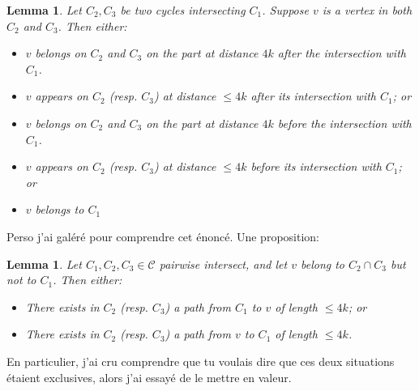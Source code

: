 \documentclass[utf8,10pt]{article}
\theoremstyle{plain}
\newtheorem{lemma}[theorem]{Lemma}
\theoremstyle{definition}
\theoremstyle{remark}
\newcommand{\nathann}[1]{{\color{blue}{\bf Nathann:} #1}}
\begin{document}
\begin{lemma}\label{dis}
Let $C_2, C_3$ be two cycles intersecting $C_1$. Suppose $v$ is a vertex in both $C_2$ and $C_3$. Then \nathann{either}:
\begin{itemize}
	\item $v$ belongs on $C_2$ and $C_3$ on the part at distance $4k$ after the intersection with $C_1$.
	\item \nathann{$v$ appears on $C_2$ (resp. $C_3$) at distance $\leq 4k$ after its intersection with $C_1$; or}
	\item $v$ belongs on $C_2$ and $C_3$ on the part at distance $4k$ before the intersection with $C_1$.
	\item \nathann{$v$ appears on $C_2$ (resp. $C_3$) at distance $\leq 4k$ before its intersection with $C_1$; or}
	\item $v$ belongs to $C_1$
\end{itemize}
\end{lemma}

\nathann{Perso j'ai galéré pour comprendre cet énoncé. Une proposition:

\begin{lemma}\label{dis}
Let $C_1,C_2,C_3\in\mathcal C$ pairwise intersect, and let $v$ belong to $C_2\cap C_3$ but not to $C_1$. Then either:
\begin{itemize}
\item There exists in $C_2$ (resp. $C_3$) a path from $C_1$ to $v$ of length $\leq 4k$; or
\item There exists in $C_2$ (resp. $C_3$) a path from $v$ to $C_1$ of length $\leq 4k$.
\end{itemize}
\end{lemma}

En particulier, j'ai cru comprendre que tu voulais dire que ces deux situations
étaient exclusives, alors j'ai essayé de le mettre en valeur.

}
\end{document}
